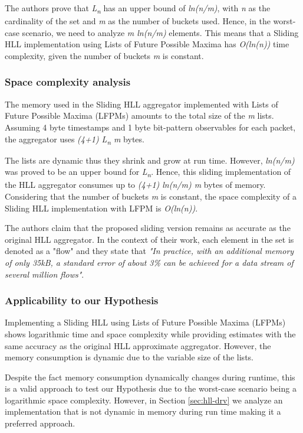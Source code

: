 The authors prove that \textit{L\textsubscript{n}} has an upper bound of \textit{ln(n/m)}, with \textit{n} as the cardinality of the set and \textit{m} as the number of buckets used. Hence, in the worst-case scenario, we need to analyze \textit{m ln(n/m)} elements. This means that a Sliding HLL implementation using Lists of Future Possible Maxima has \textit{O(ln(n))} time complexity, given the number of buckets \textit{m} is constant.

\subsubsection*{Space complexity analysis}
The memory used in the Sliding HLL aggregator implemented with Lists of Future Possible Maxima (LFPMs) amounts to the total size of the \textit{m} lists. Assuming 4 byte timestamps and 1 byte bit-pattern observables for each packet, the aggregator uses \textit{(4+1) L\textsubscript{n} m} bytes. 

The lists are dynamic thus they shrink and grow at run time. However, \textit{ln(n/m)} was proved to be an upper bound for \textit{L\textsubscript{n}}. Hence, this sliding implementation of the HLL aggregator consumes up to \textit{(4+1) ln(n/m) m} bytes of memory. Considering that the number of buckets \textit{m} is constant, the space complexity of a Sliding HLL implementation with LFPM is \textit{O(ln(n))}.

The authors claim that the proposed sliding version remains as accurate as the original HLL aggregator. In the context of their work, each element in the set is denoted as a "flow" and they state that \textit{"In practice, with an additional memory of only 35kB, a standard error of about 3\% can be achieved for a data stream of several million flows"}.


\subsubsection*{Applicability to our Hypothesis}
Implementing a Sliding HLL using Lists of Future Possible Maxima (LFPMs) shows logarithmic time and space complexity while providing estimates with the same accuracy as the original HLL approximate aggregator. However, the memory consumption is dynamic due to the variable size of the lists. 

Despite the fact memory consumption dynamically changes during runtime, this is a valid approach to test our Hypothesis due to the worst-case scenario being a logarithmic space complexity. However, in Section \ref{sec:hll-drv} we analyze an implementation that is not dynamic in memory during run time making it a preferred approach.


